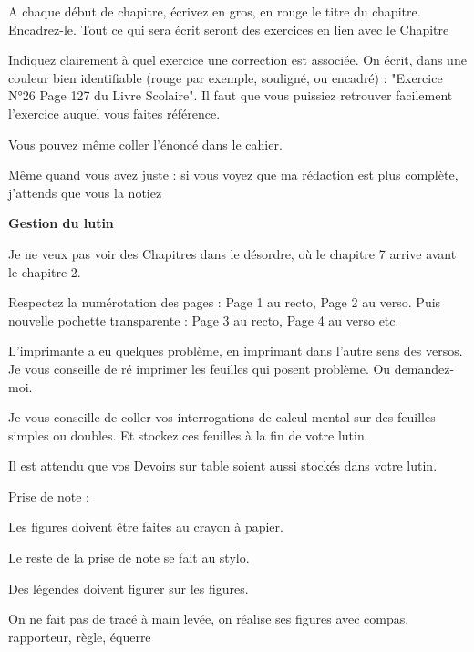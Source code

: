 \documentclass[answers]{exam}
\begin{document}
\begin{compactitem}
  \item A chaque début de chapitre, écrivez en gros, en rouge le titre du chapitre. Encadrez-le. Tout ce qui sera écrit seront des exercices en lien avec le Chapitre
  \item Indiquez clairement à quel exercice une correction est associée. On écrit, dans une couleur bien identifiable (rouge par exemple, souligné, ou encadré) : "Exercice N°26 Page 127 du Livre Scolaire". Il faut que vous puissiez retrouver facilement l'exercice auquel vous faites référence.
  \item Vous pouvez même coller l'énoncé dans le cahier. 
  \item Même quand vous avez juste : si vous voyez que ma rédaction est plus complète, j'attends que vous la notiez
\end{compactitem}

\vspace{1em}
\noindent\textbf{\large Gestion du lutin}\par\vspace{0.5\baselineskip}

\begin{compactitem}
  \item Je ne veux pas voir des Chapitres dans le désordre, où le chapitre 7 arrive avant le chapitre 2.
  \item Respectez la numérotation des pages : Page 1 au recto, Page 2 au verso. Puis nouvelle pochette transparente : Page 3 au recto, Page 4 au verso etc.
  \item L'imprimante a eu quelques problème, en imprimant dans l'autre sens des versos. Je vous conseille de ré imprimer les feuilles qui posent problème. Ou demandez-moi. 
  \item Je vous conseille de coller vos interrogations de calcul mental sur des feuilles simples ou doubles. Et stockez ces feuilles à la fin de votre lutin. 
  \item Il est attendu que vos Devoirs sur table soient aussi stockés dans votre lutin. 
  \item Prise de note : 
  \begin{compactitem}
    \item Les figures doivent être faites au crayon à papier.
    \item Le reste de la prise de note se fait au stylo.
    \item Des légendes doivent figurer sur les figures.
    \item On ne fait pas de tracé à main levée, on réalise ses figures avec compas, rapporteur, règle, équerre
  \end{compactitem}
\end{compactitem}
\end{document}
